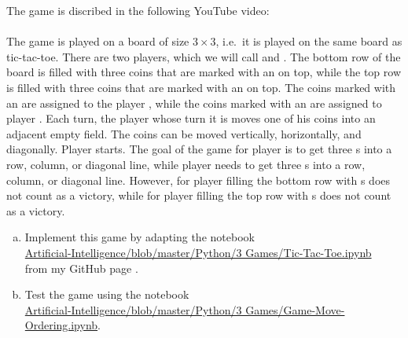 \exercise
The game  is discribed in the following YouTube video:
\\[0.2cm]
\hspace*{1.3cm}
\href{https://www.youtube.com/watch?v=R-aSW1MQwEo}{}
\\[0.2cm]
The game is played on a board of size $3 \times 3$, i.e.~it is played on the same board as tic-tac-toe.
There are two players, which we will call  and .  The bottom row of the board is filled
with three coins that are marked with an  on top, while the top row is filled with three coins that
are marked with an  on top.  The coins marked with an  are assigned to the player ,
while the coins marked with an  are assigned to player .
Each turn, the player whose turn it is moves one of his coins into an adjacent empty field.  The coins can be
moved vertically, horizontally, and diagonally. 
Player  starts.  The goal of the game for player  is to get three s into a row, column, or
diagonal line, while player  needs to get three s into a row, column, or diagonal line.  However, for
player  filling the bottom row with s does not count as a victory, while for player
  filling the top row with s does not count as a victory.
\begin{enumerate}[(a)]
\item Implement this game by adapting the notebook
      \\[0.2cm]
      \hspace*{1.3cm}
      \href{https://github.com/karlstroetmann/Artificial-Intelligence/blob/master/Python/3 Games/Tic-Tac-Toe.ipynb}{
            Artificial-Intelligence/blob/master/Python/3 Games/Tic-Tac-Toe.ipynb}
      \\[0.2cm]
      from my GitHub page .
\item Test the game using the notebook
      \\[0.2cm]
      \hspace*{1.3cm}
      \href{https://github.com/karlstroetmann/Artificial-Intelligence/blob/master/Python/3 Games/Game-Move-Ordering.ipynb}{
           Artificial-Intelligence/blob/master/Python/3 Games/Game-Move-Ordering.ipynb}.
      \eox
\end{enumerate}

